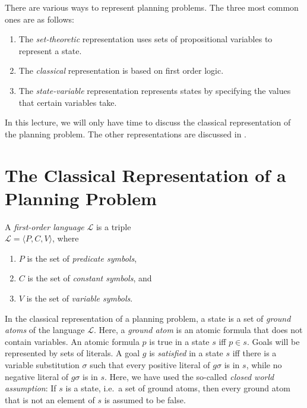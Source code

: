 There are various ways to represent planning problems.  The three most common ones are as follows:
\begin{enumerate}
\item The \emph{set-theoretic} representation uses sets of propositional variables to represent a
      state.
\item The \emph{classical} representation is based on first order logic.
\item The \emph{state-variable} representation represents states by specifying the values that
      certain variables take.
\end{enumerate}
In this lecture, we will only have time to discuss the classical representation of the planning
problem.  The other representations are discussed in \cite{ghallab:2004}.


\section{The Classical Representation of a Planning Problem}
A \emph{first-order language} $\mathcal{L}$ is a triple
\\[0.2cm]
\hspace*{1.3cm}
$\mathcal{L} = \langle P, C, V \rangle$, \quad where
\begin{enumerate}
\item $P$ is the set of \emph{predicate symbols},
\item $C$ is the set of \emph{constant symbols}, and
\item $V$ is the set of \emph{variable symbols}.
\end{enumerate}

In the classical representation of a planning problem, a state is a set of \emph{ground atoms} of the
language $\mathcal{L}$.  Here, a \emph{ground atom} is an atomic formula that does not contain
variables.  An atomic formula $p$ is true in a state $s$ iff $p \in s$.  Goals will be represented
by sets of literals.  A goal $g$ is \emph{satisfied} in a state $s$ iff there is a variable
substitution $\sigma$ such that every positive literal of $g\sigma$ is in $s$, while no negative
literal of $g\sigma$ is in $s$.  Here, we have used the so-called \emph{closed world assumption}:
If $s$ is a state, i.e.~a set of ground atoms, then every ground atom that is not an element of $s$
is assumed to be false.


